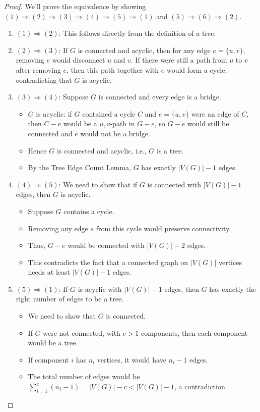 \documentclass{article}
\theoremstyle{definition}
\begin{document}
\begin{proof} 
We'll prove the equivalence by showing $(1) \Rightarrow (2) \Rightarrow (3) \Rightarrow (4) \Rightarrow (5) \Rightarrow (1)$ and $(5) \Rightarrow (6) \Rightarrow (2)$.

\begin{enumerate}
    \item $(1) \Rightarrow (2)$: This follows directly from the definition of a tree.
    
    \item $(2) \Rightarrow (3)$: If $G$ is connected and acyclic, then for any edge $e = \{u,v\}$, removing $e$ would disconnect $u$ and $v$. If there were still a path from $u$ to $v$ after removing $e$, then this path together with $e$ would form a cycle, contradicting that $G$ is acyclic.
    
    \item $(3) \Rightarrow (4)$: Suppose $G$ is connected and every edge is a bridge.
    \begin{itemize}
        \item $G$ is acyclic: if $G$ contained a cycle $C$ and $e = \{u,v\}$ were an edge of $C$, then $C - e$ would be a $u,v$-path in $G - e$, so $G - e$ would still be connected and $e$ would not be a bridge.
        \item Hence $G$ is connected and acyclic, i.e., $G$ is a tree.
        \item By the Tree Edge Count Lemma, $G$ has exactly $|V(G)| - 1$ edges.
    \end{itemize}
    
    \item $(4) \Rightarrow (5)$: We need to show that if $G$ is connected with $|V(G)| - 1$ edges, then $G$ is acyclic.
    \begin{itemize}
        \item Suppose $G$ contains a cycle.
        \item Removing any edge $e$ from this cycle would preserve connectivity.
        \item Thus, $G-e$ would be connected with $|V(G)| - 2$ edges.
        \item This contradicts the fact that a connected graph on $|V(G)|$ vertices needs at least $|V(G)| - 1$ edges.
    \end{itemize}
    
    \item $(5) \Rightarrow (1)$: If $G$ is acyclic with $|V(G)| - 1$ edges, then $G$ has exactly the right number of edges to be a tree.
    \begin{itemize}
        \item We need to show that $G$ is connected.
        \item If $G$ were not connected, with $c > 1$ components, then each component would be a tree.
        \item If component $i$ has $n_i$ vertices, it would have $n_i - 1$ edges.
        \item The total number of edges would be $\sum_{i=1}^{c} (n_i - 1) = |V(G)| - c < |V(G)| - 1$, a contradiction.
    \end{itemize}
    

\end{enumerate}
\end{proof}
\end{document}
